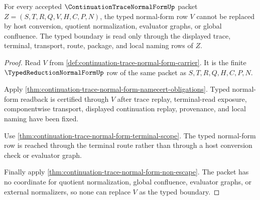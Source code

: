 \begin{theorem}
\label{thm:continuation-trace-normal-form-typed-boundary-nonescape}
For every accepted $\ContinuationTraceNormalFormUp$ packet $Z=(S,T,R,Q,V,H,C,P,N)$, the typed normal-form row $V$ cannot be replaced by host conversion, quotient normalization, evaluator graphs, or global confluence. The typed boundary is read only through the displayed trace, terminal, transport, route, package, and local naming rows of $Z$.
\end{theorem}
\begin{proof}
Read $V$ from \autoref{def:continuation-trace-normal-form-carrier}. It is the finite $\TypedReductionNormalFormUp$ row of the same packet as $S,T,R,Q,H,C,P,N$.

Apply \autoref{thm:continuation-trace-normal-form-namecert-obligations}. Typed normal-form readback is certified through $V$ after trace replay, terminal-read exposure, componentwise transport, displayed continuation replay, provenance, and local naming have been fixed.

Use \autoref{thm:continuation-trace-normal-form-terminal-scope}. The typed normal-form row is reached through the terminal route rather than through a host conversion check or evaluator graph.

Finally apply \autoref{thm:continuation-trace-normal-form-non-escape}. The packet has no coordinate for quotient normalization, global confluence, evaluator graphs, or external normalizers, so none can replace $V$ as the typed boundary.
\end{proof}

